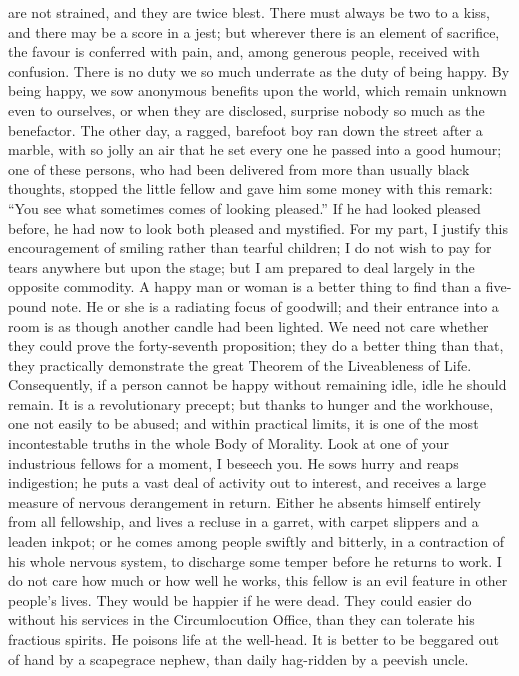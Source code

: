 are not strained, and they are twice blest. There must always be two
to a kiss, and there may be a score in a jest; but wherever there is
an element of sacrifice, the favour is conferred with pain, and, among
generous people, received with confusion. There is no duty we so much
underrate as the duty of being happy. By being happy, we sow anonymous
benefits upon the world, which remain unknown even to ourselves, or
when they are disclosed, surprise nobody so much as the benefactor.
 The other day, a ragged, barefoot boy ran down the street
after a marble, with so jolly an air that he set every one he passed
into a good humour; one of these persons, who had been delivered from
more than usually black thoughts, stopped the little fellow and gave
him some money with this remark: ``You see what sometimes comes of
looking pleased.'' If he had looked pleased before, he had now to look
both pleased and mystified. For my part, I justify this encouragement
of smiling rather than tearful children; I do not wish to pay for
tears anywhere but upon the stage; but I am prepared to deal largely
in the opposite commodity. A happy man or woman is a better thing to
find than a five-pound note. He or she is a radiating focus of
goodwill; and their entrance into a room is as though another candle
had been lighted. We need not care whether they could prove the
forty-seventh proposition; they do a better thing than that, they
practically demonstrate the great Theorem of the Liveableness of Life.
Consequently, if a  person cannot be happy without remaining
idle, idle he should remain. It is a revolutionary precept; but thanks
to hunger and the workhouse, one not easily to be abused; and within
practical limits, it is one of the most incontestable truths in the
whole Body of Morality. Look at one of your industrious fellows for a
moment, I beseech you. He sows hurry and reaps indigestion; he puts a
vast deal of activity out to interest, and receives a large measure of
nervous derangement in return. Either he absents himself entirely from
all fellowship, and lives a recluse in a garret, with carpet slippers
and a leaden inkpot; or he comes among people swiftly and bitterly, in
a contraction of his whole nervous system, to discharge some temper
before he returns to work. I do not care how much or how well he
works, this fellow is an evil feature in other people's lives. They
would be happier if he were dead. They could easier do without his
services in the Circumlocution Office, than they can tolerate his
fractious spirits. He  poisons life at the well-head. It is
better to be beggared out of hand by a scapegrace nephew, than daily
hag-ridden by a peevish uncle.

